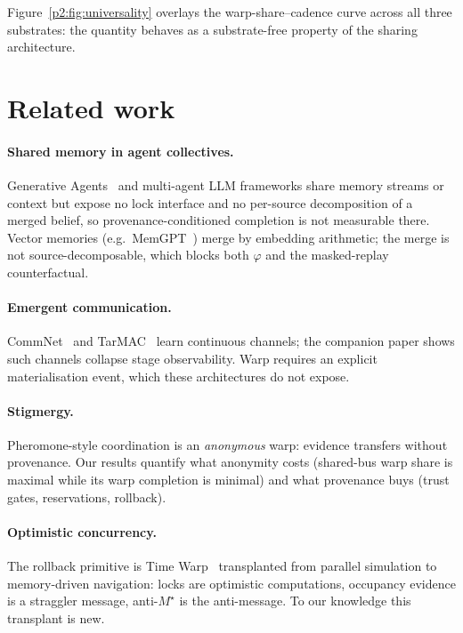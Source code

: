 \documentclass{article}
\newcommand{\mstar}{M^{\star}}
\begin{document}
Figure~\ref{p2:fig:universality} overlays the warp-share--cadence curve
across all three substrates: the quantity behaves as a substrate-free
property of the sharing architecture.

\section{Related work}
\label{p2:sec:related}

\paragraph{Shared memory in agent collectives.} Generative
Agents~\cite{park2023generative} and multi-agent LLM frameworks share
memory streams or context but expose no lock interface and no
per-source decomposition of a merged belief, so provenance-conditioned
completion is not measurable there. Vector memories (e.g.\
MemGPT~\cite{packer2023memgpt}) merge by embedding arithmetic;
the merge is not source-decomposable, which blocks both $\varphi$ and
the masked-replay counterfactual.
\paragraph{Emergent communication.} CommNet~\cite{sukhbaatar2016commnet}
and TarMAC~\cite{das2019tarmac} learn continuous channels; the
companion paper shows such channels collapse stage observability. Warp
requires an explicit materialisation event, which these architectures
do not expose.
\paragraph{Stigmergy.} Pheromone-style coordination is an
\emph{anonymous} warp: evidence transfers without provenance. Our
results quantify what anonymity costs (shared-bus warp share is
maximal while its warp completion is minimal) and what
provenance buys (trust gates, reservations, rollback).
\paragraph{Optimistic concurrency.} The rollback primitive is Time
Warp~\cite{jefferson1985} transplanted from parallel simulation to
memory-driven navigation: locks are optimistic computations,
occupancy evidence is a straggler message, anti-$\mstar$ is the
anti-message. To our knowledge this transplant is new.
\end{document}
